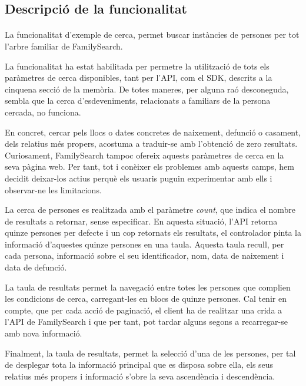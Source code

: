 \subsection{Descripció de la funcionalitat}\label{sec:searchTree}

    \paragraph{}
    La funcionalitat d'exemple de cerca, permet buscar instàncies de persones per tot l'arbre familiar de FamilySearch.

    La funcionalitat ha estat habilitada per permetre la utilització de tots els paràmetres de cerca disponibles, tant per l'API, com el SDK, descrits a la cinquena secció de la memòria. De totes maneres, per alguna raó desconeguda, sembla que la cerca d'esdeveniments, relacionats a familiars de la persona cercada, no funciona.

    En concret, cercar pels llocs o dates concretes de naixement, defunció o casament, dels relatius més propers, acostuma a traduir-se amb l'obtenció de zero resultats. Curiosament, FamilySearch tampoc ofereix aquests paràmetres de cerca en la seva pàgina web. Per tant, tot i conèixer els problemes amb aquests camps, hem decidit deixar-los actius perquè els usuaris puguin experimentar amb ells i observar-ne les limitacions.

    La cerca de persones es realitzada amb el paràmetre \emph{count}, que indica el nombre de resultats a retornar, sense especificar. En aquesta situació, l'API retorna quinze persones per defecte i un cop retornats els resultats, el controlador pinta la informació d'aquestes quinze persones en una taula. Aquesta taula recull, per cada persona, informació sobre el seu identificador, nom, data de naixement i data de defunció.

    La taula de resultats permet la navegació entre totes les persones que complien les condicions de cerca, carregant-les en blocs de quinze persones. Cal tenir en compte, que per cada acció de paginació, el client ha de realitzar una crida a l'API de FamilySearch i que per tant, pot tardar alguns segons a recarregar-se amb nova informació.

    Finalment, la taula de resultats, permet la selecció d'una de les persones, per tal de desplegar tota la informació principal que es disposa sobre ella, els seus relatius més propers i informació s'obre la seva ascendència i descendència.
